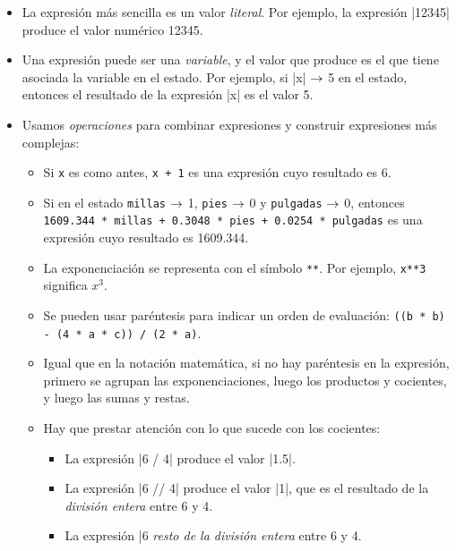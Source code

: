 \begin{itemize}
\item La expresión más sencilla es un valor \emph{literal}.  Por ejemplo,
    la expresión |12345| produce el valor numérico 12345.

\item Una expresión puede ser una \emph{variable}, y el valor que produce es el
    que tiene asociada la variable en el estado. Por ejemplo, si |x| $\rightarrow$ 5 en
    el estado, entonces el resultado de la expresión |x|  es el valor 5.

\item Usamos \emph{operaciones} para combinar expresiones y construir
expresiones más complejas:

\begin{itemize}
\item Si \lstinline!x! es como antes, \lstinline!x + 1! es una expresión cuyo
resultado es 6.

\item Si en el estado \lstinline!millas! $\rightarrow$ 1, \lstinline!pies! $\rightarrow$ 0 y
\lstinline!pulgadas! $\rightarrow$ 0, entonces
\lstinline[breaklines=true]!1609.344 * millas + 0.3048 * pies + 0.0254 * pulgadas! es una
expresión cuyo resultado es 1609.344.

\item La exponenciación se representa con el símbolo \lstinline!**!. Por
ejemplo, \lstinline!x**3! significa $x^3$.

\item Se pueden usar paréntesis para indicar un orden de
evaluación: \lstinline[breaklines=true]!((b * b) - (4 * a * c)) / (2 * a)!.

\item Igual que en la notación matemática, si no hay paréntesis en la
expresión, primero se agrupan las exponenciaciones, luego los
productos y cocientes, y luego las sumas y restas.

\item Hay que prestar atención con lo que sucede con los
cocientes:

\begin{itemize}
\item La expresión |6 / 4| produce el valor |1.5|.
\item La expresión |6 // 4| produce el valor |1|, que es el resultado de la
    \emph{división entera} entre 6 y 4.
\item La expresión |6 %
    \emph{resto de la división entera} entre 6 y 4.
\end{itemize}


\end{itemize}
\end{itemize}
